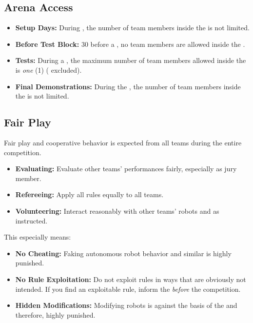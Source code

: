 \subsection{Arena Access}
\label{sec:rules:arenaaccess}
\begin{itemize}
	\item \textbf{Setup Days:} During \SetupDays{}, the number of team members inside the \Arena{} is not limited.
	\item \textbf{Before Test Block:} \SI{30}{\min} before a \Testblock{}, no team members are allowed inside the \Arena{}.
	\item \textbf{Tests:} During a \Testslot{}, the maximum number of team members allowed inside the \Arena{} is \emph{one} (1) (\Volunteers{} excluded).
	\item \textbf{Final Demonstrations:} During the \FINAL{}, the number of team members inside the \Arena{} is not limited.
\end{itemize}


\subsection{Fair Play}
\label{sec:rules:fairplay}
Fair play and cooperative behavior is expected from all teams during the entire competition.
\begin{itemize}
	\item \textbf{Evaluating:} Evaluate other teams' performances fairly, especially as jury member.
	\item \textbf{Refereeing:} Apply all rules equally to all teams.
	\item \textbf{Volunteering:} Interact reasonably with other teams' robots and as instructed.
\end{itemize}
This especially means:
\begin{itemize}
	\item \textbf{No Cheating:} Faking autonomous robot behavior and similar is highly punished. 
	\item \textbf{No Rule Exploitation:} Do not exploit rules in ways that are obviously not intended. If you find an exploitable rule, inform the \TC{} \emph{before}  the competition.
	\item \textbf{Hidden Modifications:} Modifying robots is against the basis of the \SPLs{} and therefore, highly punished.
\end{itemize}


